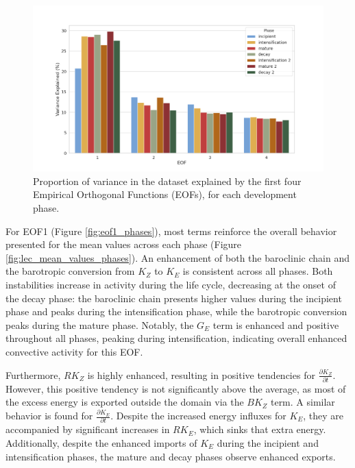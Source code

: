 \begin{figure}[!htbp]
\centering
\includegraphics[width=\textwidth]{figs_5/variance_explained_all_phases.png}
\caption[EOF - Explained Variance for Each Phase]{Proportion of variance in the dataset explained by the first four Empirical Orthogonal Functions (EOFs), for each development phase.}
\label{fig:variance_explained_all_phases}
\end{figure}

For EOF1 (Figure \ref{fig:eof1_phases}), most terms reinforce the overall behavior presented for the mean values across each phase (Figure \ref{fig:lec_mean_values_phases}). An enhancement of both the baroclinic chain and the barotropic conversion from $K_Z$ to $K_E$ is consistent across all phases. Both instabilities increase in activity during the life cycle, decreasing at the onset of the decay phase: the baroclinic chain presents higher values during the incipient phase and peaks during the intensification phase, while the barotropic conversion peaks during the mature phase. Notably, the $G_E$ term is enhanced and positive throughout all phases, peaking during intensification, indicating overall enhanced convective activity for this EOF.

Furthermore, $RK_Z$ is highly enhanced, resulting in positive tendencies for $\frac{\partial K_Z}{\partial t}$. However, this positive tendency is not significantly above the average, as most of the excess energy is exported outside the domain via the $BK_Z$ term. A similar behavior is found for $\frac{\partial K_E}{\partial t}$. Despite the increased energy influxes for $K_E$, they are accompanied by significant increases in $RK_E$, which sinks that extra energy. Additionally, despite the enhanced imports of $K_E$ during the incipient and intensification phases, the mature and decay phases observe enhanced exports.

